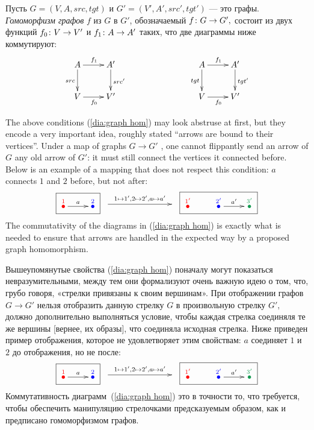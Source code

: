 \documentclass[../main/CT4S-EN-RU]{subfiles}
\begin{document}
\begin{definitionRUS}\label{def:graph homomorphism}
Пусть $G=(V,A,src,tgt)$ и $G'=(V',A',src',tgt')$ — это графы. {\em Гомоморфизм графов} $f$ из $G$ в $G'$, обозначаемый $f\colon G\rightarrow G',$ состоит из двух функций $f_0\colon V\rightarrow V'$ и $f_1\colon A\rightarrow A'$ таких, что две диаграммы ниже коммутируют:
\begin{align}\label{dia:graph hom}
\xymatrix{
    A \ar[r]^{f_1} \ar[d]_{src}  &  A' \ar[d]^{src'}  \\
    V \ar[r]_{f_0}  &  V'
}
\hspace{1in}
\xymatrix{
    A \ar[r]^{f_1} \ar[d]_{tgt}  &  A' \ar[d]^{tgt'}  \\
    V \ar[r]_{f_0}  &  V'
}
\end{align}
\end{definitionRUS}

\begin{remarkENG}
The above conditions (\ref{dia:graph hom}) may look abstruse at first, but they encode a very important idea, roughly stated “arrows are bound to their vertices”. Under a map of graphs $G\to G'$ , one cannot flippantly send an arrow of $G$ any old arrow of $G'$: it must still connect the vertices it connected before. Below is an example of a mapping that does not respect this condition: $a$ connects $1$ and $2$ before, but not after:
$$
\fbox{\xymatrix{\LMO{\color{red}{1}}\ar[r]^{a}&\LMO{\color{blue}{2}}}}
\xymatrix{~\ar[rr]^{1\mapsto 1',2\mapsto 2', a\mapsto a'}&\hsp&~}
\fbox{\xymatrix{\LMO{\color{red}{1'}}&\LMO{\color{blue}{2'}}\ar[r]^{a'}&\LMO{\color{ForestGreen}{3'}}}}
$$
The commutativity of the diagrams in (\ref{dia:graph hom}) is exactly what is needed to ensure that arrows are handled in the expected way by a proposed graph homomorphism.
\end{remarkENG}

\begin{remarkRUS}
Вышеупомянутые свойства (\ref{dia:graph hom}) поначалу могут показаться невразумительными, между тем они формализуют очень важную идею о том, что, грубо говоря, «стрелки привязаны к своим вершинам». При отображении графов $G\to G'$ нельзя отобразить данную стрелку $G$ в произвольную стрелку $G',$ должно дополнительно выполняться условие, чтобы каждая стрелка соединяля те же вершины [вернее, их образы], что соединяла исходная стрелка. Ниже приведен пример отображения, которое не удовлетворяет этим свойствам: $a$ соединяет $1$ и $2$ до отображения, но не после:
$$
\fbox{\xymatrix{
    \LMO{\color{red}{1}} \ar[r]^{a}  &  \LMO{\color{blue}{2}}
}}
\xymatrix{
    ~ \ar[rr]^{1\mapsto 1', 2\mapsto 2', a\mapsto a'}  &  \hsp  &  ~
}
\fbox{\xymatrix{
    \LMO{\color{red}{1'}}  &  \LMO{\color{blue}{2'}} \ar[r]^{a'}  &  \LMO{\color{ForestGreen}{3'}}
}}
$$
Коммутативность диаграмм~(\ref{dia:graph hom}) это в точности то, что требуется, чтобы обеспечить манипуляцию стрелочками предсказуемым образом, как и предписано гомоморфизмом графов.
\end{remarkRUS}
\end{document}
